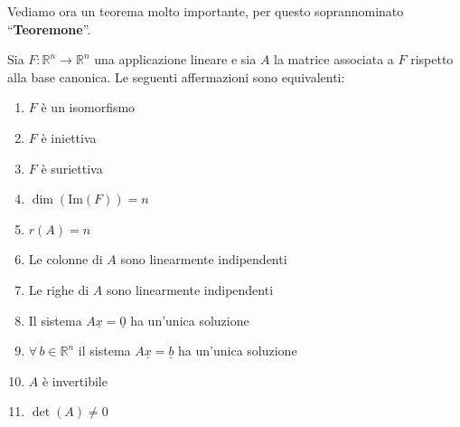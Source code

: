 \documentclass[
  a4paper,
]{article}
\providecommand{\tightlist}{%
  \setlength{\itemsep}{0pt}\setlength{\parskip}{0pt}}
\providecommand{\tightlist}{}
\begin{document}
Vediamo ora un teorema molto importante, per questo soprannominato
``\textbf{Teoremone}''.

\begin{teoremabox}
Sia \(F : \mathbb{R}^n \to \mathbb{R}^n\) una applicazione lineare e sia
\(A\) la matrice associata a \(F\) rispetto alla base canonica. Le
seguenti affermazioni sono equivalenti:

\begin{enumerate}
\def\labelenumi{\arabic{enumi}.}
\tightlist
\item
  \(F\) è un isomorfismo
\item
  \(F\) è iniettiva
\item
  \(F\) è suriettiva
\item
  \(\dim(\text{Im}(F))=n\)
\item
  \(r(A) = n\)
\item
  Le colonne di \(A\) sono linearmente indipendenti
\item
  Le righe di \(A\) sono linearmente indipendenti
\item
  Il sistema \(A\underline{x} = \underline{0}\) ha un'unica soluzione
\item
  \(\forall\, b \in \mathbb{R}^n\) il sistema
  \(A\underline{x} = \underline{b}\) ha un'unica soluzione
\item
  \(A\) è invertibile
\item
  \(\det(A) \not = 0\)
\end{enumerate}
\end{teoremabox}
\end{document}
